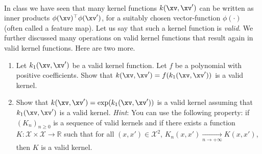 \documentclass{./../../tex_import/ETHuebung_english}
\begin{document}


\ \ 
\vspace{-1.5cm}

In class we have seen that many kernel functions $k(\xv, \xv')$ can be written as
inner products $\phi(\xv)^\top \phi(\xv')$, for a suitably chosen vector-function $\phi(\cdot)$ (often called a feature map). Let us say that such a kernel function is \textit{valid}.
We further discussed many operations on valid kernel functions that result again in valid kernel functions.  Here are two more.

\begin{enumerate}
	\item Let $k_1(\xv, \xv' )$ be a valid kernel function. Let $f$ be a polynomial with positive coefficients. Show that $k(\xv, \xv')=f(k_1(\xv, \xv'))$ is a valid kernel.
	
	\item Show that $k(\xv, \xv' ) =\exp(k_1(\xv, \xv' ))$ is a valid kernel assuming that $k_1(\xv, \xv' )$ is a valid kernel. 
	\textit{Hint}: You can use the following property: if $(K_n)_{n \geq 0}$ is a sequence of valid kernels and if there exists
	a function $K : \mathcal{X} \times \mathcal{X} \to \mathbb{R}$
	such that for all $(x, x') \in \mathcal{X}^2$, $K_n(x, x') \underset{n \to + \infty}{\longrightarrow} K(x, x')$, 
	then $K$ is a valid kernel.
\end{enumerate}
\end{document}
